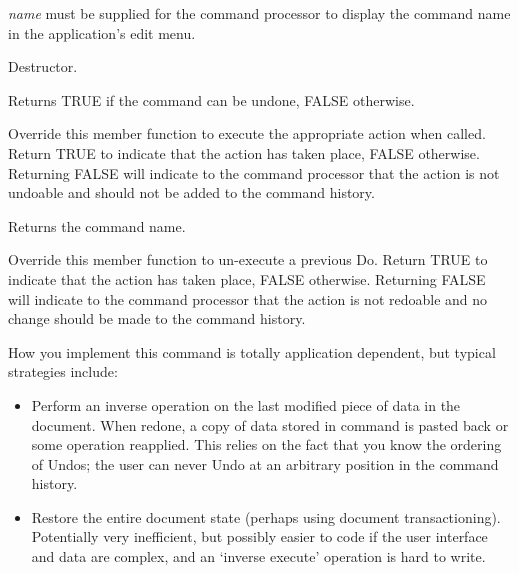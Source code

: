 {\it name} must be supplied for the command processor to display the command name
in the application's edit menu.



Destructor.



Returns TRUE if the command can be undone, FALSE otherwise.



Override this member function to execute the appropriate action when called.
Return TRUE to indicate that the action has taken place, FALSE otherwise.
Returning FALSE will indicate to the command processor that the action is
not undoable and should not be added to the command history.



Returns the command name.



Override this member function to un-execute a previous Do.
Return TRUE to indicate that the action has taken place, FALSE otherwise.
Returning FALSE will indicate to the command processor that the action is
not redoable and no change should be made to the command history.

How you implement this command is totally application dependent, but typical
strategies include:

\begin{itemize}\itemsep=0pt
\item Perform an inverse operation on the last modified piece of
data in the document. When redone, a copy of data stored in command
is pasted back or some operation reapplied. This relies on the fact that
you know the ordering of Undos; the user can never Undo at an arbitrary position
in the command history.
\item Restore the entire document state (perhaps using document transactioning).
Potentially very inefficient, but possibly easier to code if the user interface
and data are complex, and an `inverse execute' operation is hard to write.
\end{itemize}

